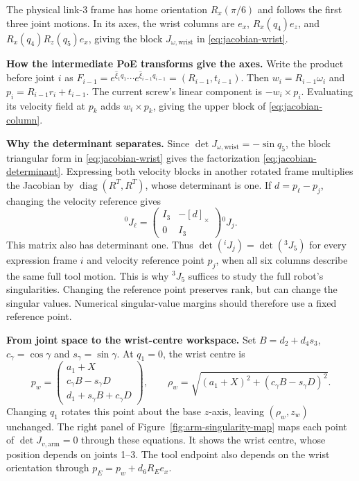 

The physical link-3 frame has home orientation $R_x(\pi/6)$ and follows
the first three joint motions. In its axes, the wrist columns are
$e_x$, $R_x(q_4)e_z$, and $R_x(q_4)R_z(q_5)e_x$, giving the block $J_{\omega,\mathrm{wrist}}$
in \eqref{eq:jacobian-wrist}.

\textbf{How the intermediate PoE transforms give the axes.}
Write the product before joint $i$ as
$F_{i-1}=e^{\widehat\xi_1q_1}\cdots e^{\widehat\xi_{i-1}q_{i-1}}
=(R_{i-1},t_{i-1})$.
Then $w_i=R_{i-1}\omega_i$ and $p_i=R_{i-1}r_i+t_{i-1}$.
The current screw's linear component is $-w_i\times p_i$.
Evaluating its velocity field at $p_k$ adds $w_i\times p_k$, giving
the upper block of \eqref{eq:jacobian-column}.

\textbf{Why the determinant separates.}
Since $\det J_{\omega,\mathrm{wrist}}=-\sin q_5$, the block triangular form in
\eqref{eq:jacobian-wrist} gives the factorization \eqref{eq:jacobian-determinant}.
Expressing both velocity blocks in another rotated frame multiplies the
Jacobian by $\operatorname{diag}(R^T,R^T)$, whose determinant is one.
If $d=p_\ell-p_j$, changing the velocity reference gives
\begin{equation}
 {}^0J_\ell=\begin{pmatrix}I_3&-[d]_\times\\0&I_3\end{pmatrix}{}^0J_j.
\end{equation}
This matrix also has determinant one. Thus
$\det({}^iJ_j)=\det({}^3J_5)$ for every expression frame $i$ and velocity
reference point $p_j$, when all six columns describe the same full tool motion.
This is why ${}^3J_5$ suffices to study the full robot's singularities.
Changing the reference point preserves rank, but can change the singular
values. Numerical singular-value margins should therefore use a fixed
reference point.

\textbf{From joint space to the wrist-centre workspace.}
Set $B=d_2+d_4s_3$, $c_\gamma=\cos\gamma$ and $s_\gamma=\sin\gamma$.
At $q_1=0$, the wrist centre is
\begin{equation}
 p_w=\begin{pmatrix}
 a_1+X\\c_\gamma B-s_\gamma D\\d_1+s_\gamma B+c_\gamma D
 \end{pmatrix},\qquad
 \rho_w=\sqrt{(a_1+X)^2+(c_\gamma B-s_\gamma D)^2}.
\end{equation}
Changing $q_1$ rotates this point about the base $z$-axis, leaving
$(\rho_w,z_w)$ unchanged. The right panel of
Figure~\ref{fig:arm-singularity-map} maps each point of $\det J_{v,\mathrm{arm}}=0$ through
these equations. It shows the wrist centre, whose position depends on
joints 1--3. The tool endpoint also depends on the wrist orientation
through $p_E=p_w+d_6R_Ee_x$.


